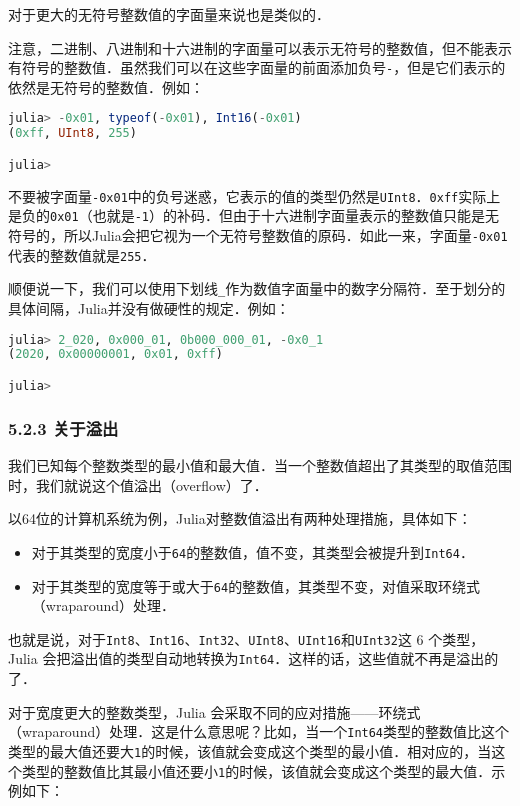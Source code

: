 对于更大的无符号整数值的字面量来说也是类似的．

注意，二进制、八进制和十六进制的字面量可以表示无符号的整数值，但不能表示有符号的整数值．虽然我们可以在这些字面量的前面添加负号\verb|-|，但是它们表示的依然是无符号的整数值．例如：

\begin{lstlisting}[language=julia]
julia> -0x01, typeof(-0x01), Int16(-0x01)
(0xff, UInt8, 255)

julia> 
\end{lstlisting}

不要被字面量\verb|-0x01|中的负号迷惑，它表示的值的类型仍然是\verb|UInt8|．\verb|0xff|实际上是负的\verb|0x01|（也就是\verb|-1|）的补码．但由于十六进制字面量表示的整数值只能是无符号的，所以Julia会把它视为一个无符号整数值的原码．如此一来，字面量\verb|-0x01|代表的整数值就是\verb|255|．

顺便说一下，我们可以使用下划线\verb|_|作为数值字面量中的数字分隔符．至于划分的具体间隔，Julia并没有做硬性的规定．例如：

\begin{lstlisting}[language=julia]
julia> 2_020, 0x000_01, 0b000_000_01, -0x0_1
(2020, 0x00000001, 0x01, 0xff)

julia> 
\end{lstlisting}

\subsubsection{5.2.3 关于溢出}

我们已知每个整数类型的最小值和最大值．当一个整数值超出了其类型的取值范围时，我们就说这个值溢出（overflow）了．

以64位的计算机系统为例，Julia对整数值溢出有两种处理措施，具体如下：

\begin{itemize}
\item 对于其类型的宽度小于\verb|64|的整数值，值不变，其类型会被提升到\verb|Int64|．
\item  对于其类型的宽度等于或大于\verb|64|的整数值，其类型不变，对值采取环绕式（wraparound）处理．
\end{itemize}

也就是说，对于\verb|Int8|、\verb|Int16|、\verb|Int32|、\verb|UInt8|、\verb|UInt16|和\verb|UInt32|这 6 个类型，Julia 会把溢出值的类型自动地转换为\verb|Int64|．这样的话，这些值就不再是溢出的了．

对于宽度更大的整数类型，Julia 会采取不同的应对措施——环绕式（wraparound）处理．这是什么意思呢？比如，当一个\verb|Int64|类型的整数值比这个类型的最大值还要大\verb|1|的时候，该值就会变成这个类型的最小值．相对应的，当这个类型的整数值比其最小值还要小\verb|1|的时候，该值就会变成这个类型的最大值．示例如下：

